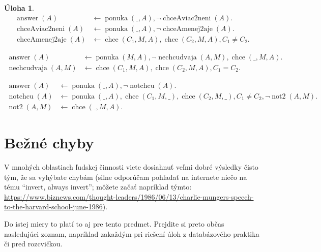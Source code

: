 \documentclass[10pt, a4paper]{article}
\theoremstyle{definition}
\newtheorem{problem}{Úloha}[section]
\def\endwrong{\color{black}}
\DeclareMathOperator{\ponuka}{ponuka}
\DeclareMathOperator{\chce}{chce}
\DeclareMathOperator{\answer}{answer}
\begin{document}
\begin{problem}
\begin{align*}
\answer(A) & \leftarrow \ponuka(\_,A), \neg \operatorname{chceAviac2neni}(A).\\
\operatorname{chceAviac2neni}(A) & \leftarrow \ponuka(\_,A), \neg \operatorname{chceAmenej2aje}(A).\\
\operatorname{chceAmenej2aje}(A) & \leftarrow \chce(C_1,M,A), \chce(C_2,M,A), C_1 \neq C_2.
\end{align*}

\begin{align*}
\answer(A) & \leftarrow \ponuka(M,A), \neg \operatorname{nechcudvaja}(A, M), \chce(\_, M, A).\\
\operatorname{nechcudvaja}(A, M) & \leftarrow \chce(C_1, M, A), \chce(C_2, M, A), C_1=C_2.
\end{align*}

\begin{align*}
\answer(A)& \leftarrow \ponuka(\_, A), \neg \operatorname{notchcu}(A).\\
\operatorname{notchcu}(A)& \leftarrow \ponuka(\_, A), \chce(C_1, M, \_), \chce(C_2, M, \_), C_1 \neq C_2, \neg \operatorname{not2}(A, M).\\
\operatorname{not2}(A, M)& \leftarrow \chce(\_, M, A).
\end{align*}
\endwrong

\end{problem}

\section{Bežné chyby}

V mnohých oblastiach ľudskej činnosti viete dosiahnuť veľmi dobré výsledky čisto tým, že sa vyhýbate chybám (silne odporúčam pohľadať na internete niečo na tému \enquote{invert, always invert}; môžete začať napríklad týmto:
{\small \url{https://www.biznews.com/thought-leaders/1986/06/13/charlie-mungers-speech-to-the-harvard-school-june-1986}}). 

Do istej miery to platí to aj pre tento predmet. Prejdite si preto občas nasledujúci zoznam, napríklad zakaždým pri riešení úloh z databázového praktika či pred rozcvičkou.
\end{document}
